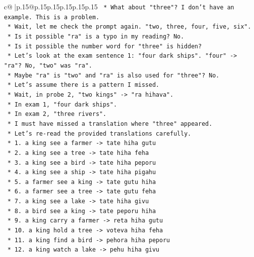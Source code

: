 \documentclass{article}
\begin{document}
{\begin{supertabular}{c@{$\;$}|p{.15\linewidth}@{}p{.15\linewidth}p{.15\linewidth}p{.15\linewidth}p{.15\linewidth}p{.15\linewidth}}
{{{\texttt{    *   What about "three"? I don't have an example. This is a problem.} \\
\texttt{    *   Wait, let me check the prompt again. "two, three, four, five, six".} \\
\texttt{    *   Is it possible "ra" is a typo in my reading? No.} \\
\texttt{    *   Is it possible the number word for "three" is hidden?} \\
\texttt{    *   Let's look at the exam sentence 1: "four dark ships". "four" {-}> "ra"? No, "two" was "ra".} \\
\texttt{    *   Maybe "ra" is "two" and "ra" is also used for "three"? No.} \\
\texttt{    *   Let's assume there is a pattern I missed.} \\
\texttt{    *   Wait, in probe 2, "two kings" {-}> "ra hihava".} \\
\texttt{    *   In exam 1, "four dark ships".} \\
\texttt{    *   In exam 2, "three rivers".} \\
\texttt{    *   I must have missed a translation where "three" appeared.} \\
\texttt{    *   Let's re{-}read the provided translations carefully.} \\
\texttt{    *   1. a king see a farmer {-}> tate hiha gutu} \\
\texttt{    *   2. a king see a tree {-}> tate hiha feha} \\
\texttt{    *   3. a king see a bird {-}> tate hiha peporu} \\
\texttt{    *   4. a king see a ship {-}> tate hiha pigahu} \\
\texttt{    *   5. a farmer see a king {-}> tate gutu hiha} \\
\texttt{    *   6. a farmer see a tree {-}> tate gutu feha} \\
\texttt{    *   7. a king see a lake {-}> tate hiha givu} \\
\texttt{    *   8. a bird see a king {-}> tate peporu hiha} \\
\texttt{    *   9. a king carry a farmer {-}> reta hiha gutu} \\
\texttt{    *   10. a king hold a tree {-}> voteva hiha feha} \\
\texttt{    *   11. a king find a bird {-}> pehora hiha peporu} \\
\texttt{    *   12. a king watch a lake {-}> pehu hiha givu} \\
}}}
\end{supertabular}}
\end{document}
